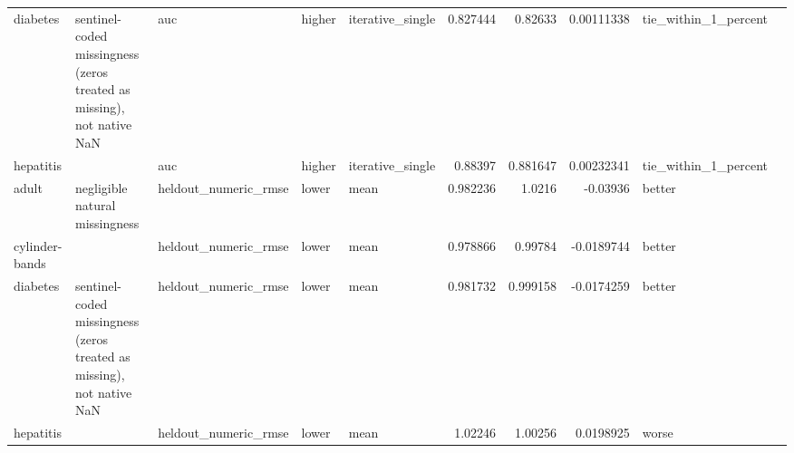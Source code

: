 \begin{table}[ht]
{\begin{tabular}{lllllrrrll}
 diabetes       & sentinel-coded missingness (zeros treated as missing), not native NaN & auc                            & higher             & iterative\_single &                   0.827444 &               0.82633  &                     0.00111338  & tie\_within\_1\_percent &                                                                                                                    \\
 hepatitis      &                                                                       & auc                            & higher             & iterative\_single &                   0.88397  &               0.881647 &                     0.00232341  & tie\_within\_1\_percent &                                                                                                                    \\
 adult          & negligible natural missingness                                        & heldout\_numeric\_rmse           & lower              & mean             &                   0.982236 &               1.0216   &                    -0.03936     & better               &                                                                                                                    \\
 cylinder-bands &                                                                       & heldout\_numeric\_rmse           & lower              & mean             &                   0.978866 &               0.99784  &                    -0.0189744   & better               &                                                                                                                    \\
 diabetes       & sentinel-coded missingness (zeros treated as missing), not native NaN & heldout\_numeric\_rmse           & lower              & mean             &                   0.981732 &               0.999158 &                    -0.0174259   & better               &                                                                                                                    \\
 hepatitis      &                                                                       & heldout\_numeric\_rmse           & lower              & mean             &                   1.02246  &               1.00256  &                     0.0198925   & worse                &                                                                                                                    \\

\end{tabular}}
\end{table}
